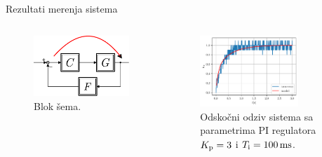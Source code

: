 \documentclass[aspectratio=169,xcolor=dvipsnames]{beamer}
\begin{document}


\begin{frame}{Rezultati merenja sistema}
	\begin{columns}[c]
    \begin{column}{.3\textwidth}
    \begin{figure}
        \centering
        \includegraphics[scale = 0.5]{h/Hsis.pdf}
        \caption{Blok šema.}
    \end{figure}      
    \end{column}
    \begin{column}{.7\textwidth}
    \begin{figure}
        \centering
        \includegraphics[width=0.75\textwidth]{fig/pi/k3t100.pdf}
        \caption{Odskočni odziv sistema sa parametrima PI regulatora  $K_{\rm p} = 3$ i $T_{\rm i} = 100 \, \rm{ms}$.}
    \end{figure}
    \end{column}
\end{columns}
\end{frame}
\end{document}
